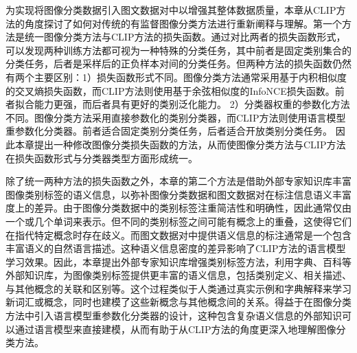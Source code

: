 为实现将图像分类数据引入图文数据对中以增强其整体数据质量，本章从CLIP方法的角度探讨了如何对传统的有监督图像分类方法进行重新阐释与理解。第一个方法是统一图像分类方法与CLIP方法的损失函数。通过对比两者的损失函数形式，可以发现两种训练方法都可视为一种特殊的分类任务，其中前者是固定类别集合的分类任务，后者是采样后的正负样本对间的分类任务。但两种方法的损失函数仍然有两个主要区别：1）损失函数形式不同。图像分类方法通常采用基于内积相似度的交叉熵损失函数\cite{alexnet}，而CLIP方法则使用基于余弦相似度的InfoNCE损失函数\cite{oord2018representation}。前者拟合能力更强，而后者具有更好的类别泛化能力。
2）分类器权重的参数化方法不同。图像分类方法采用直接参数化的类别分类器，而CLIP方法则使用语言模型重参数化分类器。前者适合固定类别分类任务，后者适合开放类别分类任务。
因此本章提出一种修改图像分类损失函数的方法，从而使图像分类方法与CLIP方法在损失函数形式与分类器类型方面形成统一。

除了统一两种方法的损失函数之外，本章的第二个方法是借助外部专家知识库丰富图像类别标签的语义信息，以弥补图像分类数据和图文数据对在标注信息语义丰富度上的差异。由于图像分类数据中的类别标签注重简洁性和明确性，因此通常仅由一个或几个单词来表示。但不同的类别标签之间可能有概念上的重叠，这使得它们在指代特定概念时存在歧义。而图文数据对中提供语义信息的标注通常是一个包含丰富语义的自然语言描述。这种语义信息密度的差异影响了CLIP方法的语言模型学习效果。因此，本章提出外部专家知识库增强类别标签方法，利用字典、百科等外部知识库，为图像类别标签提供更丰富的语义信息，包括类别定义、相关描述、与其他概念的关联和区别等。这个过程类似于人类通过真实示例和字典解释来学习新词汇或概念，同时也建模了这些新概念与其他概念间的关系。得益于在图像分类方法中引入语言模型重参数化分类器的设计，这种包含复杂语义信息的外部知识可以通过语言模型来直接建模，从而有助于从CLIP方法的角度更深入地理解图像分类方法。

